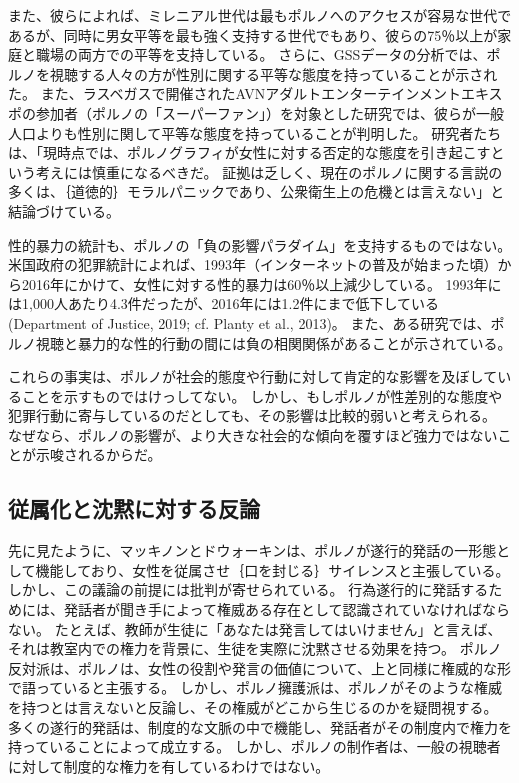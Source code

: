 \documentclass[paper=a4,book,openany]{jlreq}
\begin{document}
また、彼らによれば、ミレニアル世代は最もポルノへのアクセスが容易な世代であるが、同時に男女平等を最も強く支持する世代でもあり、彼らの75％以上が家庭と職場の両方での平等を支持している。
さらに、GSSデータの分析では、ポルノを視聴する人々の方が性別に関する平等な態度を持っていることが示された\citep{taylor16:_is_pornog_reall_makin_hate_women}。
また、ラスベガスで開催されたAVNアダルトエンターテインメントエキスポの参加者（ポルノの「スーパーファン」）を対象とした研究では、彼らが一般人口よりも性別に関して平等な態度を持っていることが判明した\citep{jackson19:_expos_mens_gender_role_attit_porn_super}。
研究者たちは、「現時点では、ポルノグラフィが女性に対する否定的な態度を引き起こすという考えには慎重になるべきだ。
証拠は乏しく、現在のポルノに関する言説の多くは、｛道徳的｝{モラル}パニックであり、公衆衛生上の危機とは言えない」と結論づけている\citep{maginn19:_how_male_porn_super_reall_view_women}。

性的暴力の統計も、ポルノの「負の影響パラダイム」を支持するものではない。
米国政府の犯罪統計によれば、1993年（インターネットの普及が始まった頃）から2016年にかけて、女性に対する性的暴力は60％以上減少している。
1993年には1,000人あたり4.3件だったが、2016年には1.2件にまで低下している(Department of Justice, 2019; cf. Planty et al., 2013)。
\nocite{department19:_nation_crime_victim_survey}
また、ある研究では、ポルノ視聴と暴力的な性的行動の間には負の相関関係があることが示されている\citep{ferguson09:_pleas_is_momen}。

これらの事実は、ポルノが社会的態度や行動に対して肯定的な影響を及ぼしていることを示すものではけっしてない。
しかし、もしポルノが性差別的な態度や犯罪行動に寄与しているのだとしても、その影響は比較的弱いと考えられる。
なぜなら、ポルノの影響が、より大きな社会的な傾向を覆すほど強力ではないことが示唆されるからだ。

\subsection{従属化と沈黙に対する反論}

先に見たように、マッキノンとドウォーキンは、ポルノが遂行的発話の一形態として機能しており、女性を従属させ｛口を封じる｝{サイレンス}と主張している。
しかし、この議論の前提には批判が寄せられている。
行為遂行的に発話するためには、発話者が聞き手によって権威ある存在として認識されていなければならない。
たとえば、教師が生徒に「あなたは発言してはいけません」と言えば、それは教室内での権力を背景に、生徒を実際に沈黙させる効果を持つ。
ポルノ反対派は、ポルノは、女性の役割や発言の価値について、上と同様に権威的な形で語っていると主張する。
しかし、ポルノ擁護派は、ポルノがそのような権威を持つとは言えないと反論し、その権威がどこから生じるのかを疑問視する。
多くの遂行的発話は、制度的な文脈の中で機能し、発話者がその制度内で権力を持っていることによって成立する。
しかし、ポルノの制作者は、一般の視聴者に対して制度的な権力を有しているわけではない。
\end{document}
